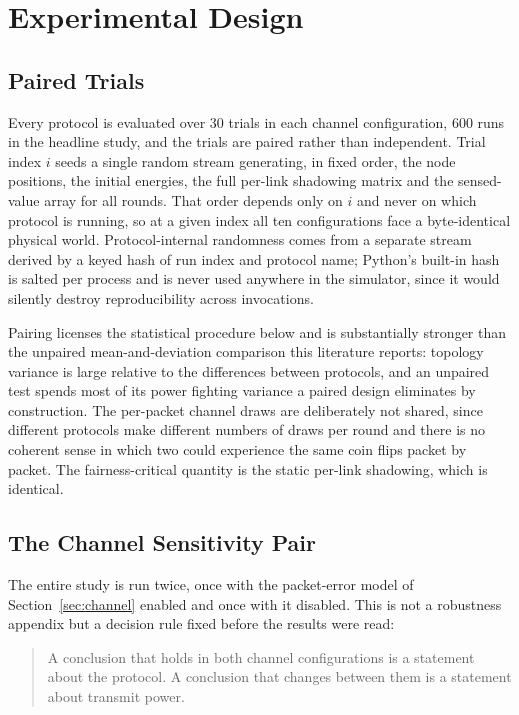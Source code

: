 \section{Experimental Design}
\label{sec:design}

\subsection{Paired Trials}

Every protocol is evaluated over 30 trials in each channel configuration, 600
runs in the headline study, and the trials are paired rather than independent.
Trial index $i$ seeds a single random stream generating, in fixed order, the
node positions, the initial energies, the full per-link shadowing matrix and the
sensed-value array for all rounds. That order depends only on $i$ and never on
which protocol is running, so at a given index all ten configurations face a
byte-identical physical world. Protocol-internal randomness comes from a
separate stream derived by a keyed hash of run index and protocol name; Python's
built-in hash is salted per process and is never used anywhere in the simulator,
since it would silently destroy reproducibility across invocations.

Pairing licenses the statistical procedure below and is substantially stronger
than the unpaired mean-and-deviation comparison this literature reports:
topology variance is large relative to the differences between protocols, and an
unpaired test spends most of its power fighting variance a paired design
eliminates by construction. The per-packet channel draws are deliberately not
shared, since different protocols make different numbers of draws per round and
there is no coherent sense in which two could experience the same coin flips
packet by packet. The fairness-critical quantity is the static per-link
shadowing, which is identical.

\subsection{The Channel Sensitivity Pair}
\label{sec:channel-pair}

The entire study is run twice, once with the packet-error model of
Section~\ref{sec:channel} enabled and once with it disabled. This is not a
robustness appendix but a decision rule fixed before the results were read:

\begin{quote}
A conclusion that holds in both channel configurations is a statement about the
protocol. A conclusion that changes between them is a statement about transmit
power.
\end{quote}

